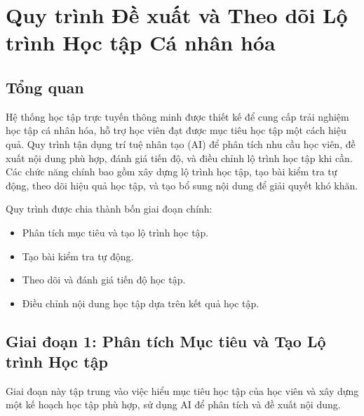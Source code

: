 

\section{Quy trình Đề xuất và Theo dõi Lộ trình Học tập Cá nhân hóa}

\subsection{Tổng quan}
Hệ thống học tập trực tuyến thông minh được thiết kế để cung cấp trải nghiệm học tập cá nhân hóa, hỗ trợ học viên đạt được mục tiêu học tập một cách hiệu quả. Quy trình tận dụng trí tuệ nhân tạo (AI) để phân tích nhu cầu học viên, đề xuất nội dung phù hợp, đánh giá tiến độ, và điều chỉnh lộ trình học tập khi cần. Các chức năng chính bao gồm xây dựng lộ trình học tập, tạo bài kiểm tra tự động, theo dõi hiệu quả học tập, và tạo bổ sung nội dung để giải quyết khó khăn.

Quy trình được chia thành bốn giai đoạn chính:
\begin{itemize}
	\item Phân tích mục tiêu và tạo lộ trình học tập.
	\item Tạo bài kiểm tra tự động.
	\item Theo dõi và đánh giá tiến độ học tập.
	\item Điều chỉnh nội dung học tập dựa trên kết quả học tập.
\end{itemize}

\subsection{Giai đoạn 1: Phân tích Mục tiêu và Tạo Lộ trình Học tập}
Giai đoạn này tập trung vào việc hiểu mục tiêu học tập của học viên và xây dựng một kế hoạch học tập phù hợp, sử dụng AI để phân tích và đề xuất nội dung.


